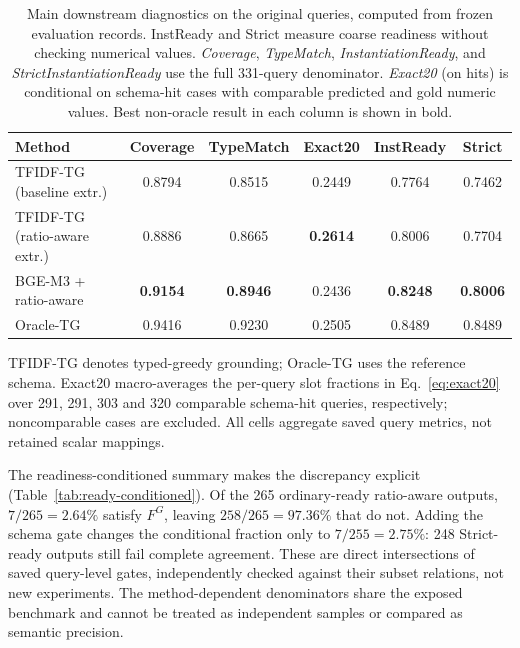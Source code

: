 \documentclass[pdflatex,iicol,sn-basic,Numbered]{sn-jnl}
\begin{document}
\begin{table}[t]
  \centering
  \renewcommand{\arraystretch}{1.18}
  \caption{Main downstream diagnostics on the original queries, computed from frozen evaluation records. InstReady and Strict measure coarse readiness without checking numerical values. \textit{Coverage}, \textit{TypeMatch}, \textit{InstantiationReady}, and \textit{StrictInstantiationReady} use the full 331-query denominator. \textit{Exact20} (on hits) is conditional on schema-hit cases with comparable predicted and gold numeric values. Best non-oracle result in each column is shown in bold.}
  \label{tab:nlp4lp-downstream-main}
  \small
  \setlength{\tabcolsep}{3.2pt}
  \renewcommand{\arraystretch}{1.12}
  \begin{tabular}{@{}lccccc@{}}
    \toprule
    Method & Coverage & TypeMatch & Exact20 & InstReady & Strict \\
    \midrule
TFIDF-TG (baseline extr.) & 0.8794 & 0.8515 & 0.2449 & 0.7764 & 0.7462 \\
TFIDF-TG (ratio-aware extr.) & 0.8886 & 0.8665 & \textbf{0.2614} & 0.8006 & 0.7704 \\
BGE-M3 + ratio-aware & \textbf{0.9154} & \textbf{0.8946} & 0.2436 & \textbf{0.8248} & \textbf{0.8006} \\
Oracle-TG & 0.9416 & 0.9230 & 0.2505 & 0.8489 & 0.8489 \\
    \bottomrule
  \end{tabular}

  \vspace{2mm}
  \raggedright
  \small
  TFIDF-TG denotes typed-greedy grounding; Oracle-TG uses the reference schema. Exact20 macro-averages the per-query slot fractions in Eq.~\eqref{eq:exact20} over 291, 291, 303 and 320 comparable schema-hit queries, respectively; noncomparable cases are excluded. All cells aggregate saved query metrics, not retained scalar mappings.
\end{table}

The readiness-conditioned summary makes the discrepancy explicit (Table~\ref{tab:ready-conditioned}). Of the 265 ordinary-ready ratio-aware outputs, $7/265=2.64\%$ satisfy $F^G$, leaving $258/265=97.36\%$ that do not. Adding the schema gate changes the conditional fraction only to $7/255=2.75\%$: 248 Strict-ready outputs still fail complete agreement. These are direct intersections of saved query-level gates, independently checked against their subset relations, not new experiments. The method-dependent denominators share the exposed benchmark and cannot be treated as independent samples or compared as semantic precision.
\end{document}

